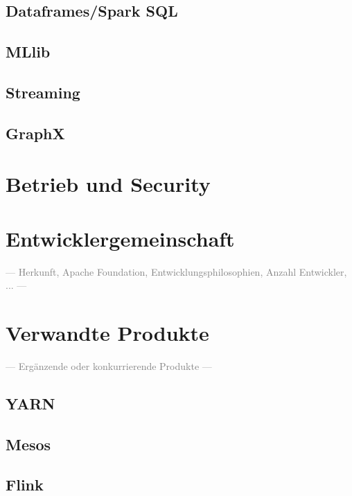 \subsection{Dataframes/Spark SQL}
\subsection{MLlib}
\subsection{Streaming}
\subsection{GraphX}

\section{Betrieb und Security}

\section{Entwicklergemeinschaft}
\textcolor{gray}{--- Herkunft, Apache Foundation, Entwicklungsphilosophien, Anzahl Entwickler, ... ---}\\

\section{Verwandte Produkte}
\textcolor{gray}{--- Ergänzende oder konkurrierende Produkte ---}\\
\subsection{YARN}
\subsection{Mesos}
\subsection{Flink}
